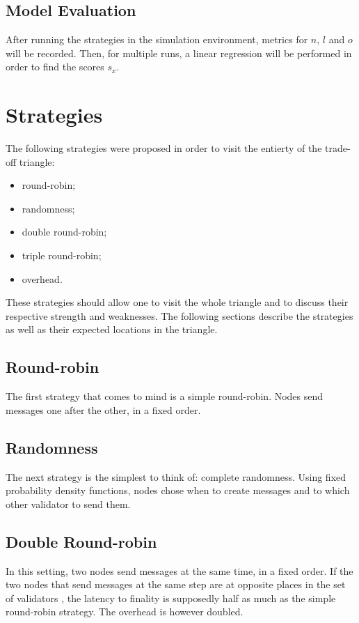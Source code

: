 \subsection{Model Evaluation}
After running the strategies in the simulation environment, metrics for \(n\),
\(l\) and \(o\) will be recorded. Then, for multiple runs, a linear regression
will be performed in order to find the scores \(s_x\).

\section{Strategies}
\label{sec:strategies}

The following strategies were proposed in order to visit the entierty of the
trade-off triangle:
\begin{itemize}
        \item round-robin;
        \item randomness;
        \item double round-robin;
        \item triple round-robin;
        \item overhead.
\end{itemize}
These strategies should allow one to visit the whole triangle and to discuss
their respective strength and weaknesses. The following sections describe the
strategies as well as their expected locations in the triangle.

\subsection{Round-robin}
The first strategy that comes to mind is a simple round-robin. Nodes send
messages one after the other, in a fixed order.

\subsection{Randomness}
The next strategy is the simplest to think of: complete randomness. Using fixed
probability density functions, nodes chose when to create messages and to which
other validator to send them.

\subsection{Double Round-robin}
In this setting, two nodes send messages at the same time, in a fixed order. If
the two nodes that send messages at the same step are at opposite places in the
set of validators , the latency to finality is supposedly
half as much as the simple round-robin strategy. The overhead is however
doubled.

